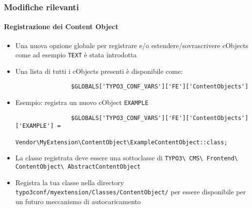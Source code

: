 
\begin{frame}[fragile]
	\frametitle{Modifiche rilevanti}
	\framesubtitle{Registrazione dei Content Object}

	\begin{itemize}

		\item Una nuova opzione globale per registrare e/o estendere/sovrascrivere cObjects come ad esempio
			\texttt{TEXT} è stata introdotta

		\item Una lista di tutti i cObjects presenti è disponibile come:

			\begin{lstlisting}
				$GLOBALS['TYPO3_CONF_VARS']['FE']['ContentObjects']
			\end{lstlisting}

		\item Esempio: registra un nuovo cObject \texttt{EXAMPLE}

			\begin{lstlisting}
				$GLOBALS['TYPO3_CONF_VARS']['FE']['ContentObjects']['EXAMPLE'] =
				  Vendor\MyExtension\ContentObject\ExampleContentObject::class;
			\end{lstlisting}

		\item La classe registrata deve essere una sottoclasse di
			\small
				\texttt{TYPO3\textbackslash
					CMS\textbackslash
					Frontend\textbackslash
					ContentObject\textbackslash
					AbstractContentObject}
			\normalsize

		\item Registra la tua classe nella directory\newline
			\small
				\texttt{typo3conf/myextension/Classes/ContentObject/}
			\normalsize\newline
			per essere disponibile per un futuro meccanismo di autocaricamento

	\end{itemize}

\end{frame}

